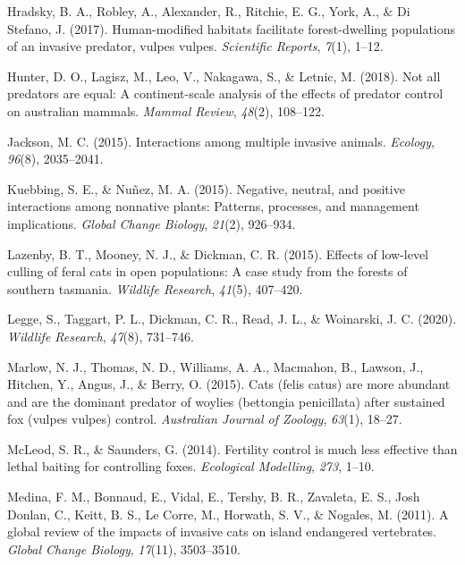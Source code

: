 \documentclass[]{elsarticle} %
\begin{document}
\leavevmode\hypertarget{ref-hradsky2017human}{}%
Hradsky, B. A., Robley, A., Alexander, R., Ritchie, E. G., York, A., \& Di Stefano, J. (2017). Human-modified habitats facilitate forest-dwelling populations of an invasive predator, vulpes vulpes. \emph{Scientific Reports}, \emph{7}(1), 1--12.

\leavevmode\hypertarget{ref-hunter2018}{}%
Hunter, D. O., Lagisz, M., Leo, V., Nakagawa, S., \& Letnic, M. (2018). Not all predators are equal: A continent-scale analysis of the effects of predator control on australian mammals. \emph{Mammal Review}, \emph{48}(2), 108--122.

\leavevmode\hypertarget{ref-jackson2015}{}%
Jackson, M. C. (2015). Interactions among multiple invasive animals. \emph{Ecology}, \emph{96}(8), 2035--2041.

\leavevmode\hypertarget{ref-kuebbing2015}{}%
Kuebbing, S. E., \& Nuñez, M. A. (2015). Negative, neutral, and positive interactions among nonnative plants: Patterns, processes, and management implications. \emph{Global Change Biology}, \emph{21}(2), 926--934.

\leavevmode\hypertarget{ref-lazenby2015}{}%
Lazenby, B. T., Mooney, N. J., \& Dickman, C. R. (2015). Effects of low-level culling of feral cats in open populations: A case study from the forests of southern tasmania. \emph{Wildlife Research}, \emph{41}(5), 407--420.

\leavevmode\hypertarget{ref-legge2020}{}%
Legge, S., Taggart, P. L., Dickman, C. R., Read, J. L., \& Woinarski, J. C. (2020). \emph{Wildlife Research}, \emph{47}(8), 731--746.

\leavevmode\hypertarget{ref-marlow2015}{}%
Marlow, N. J., Thomas, N. D., Williams, A. A., Macmahon, B., Lawson, J., Hitchen, Y., Angus, J., \& Berry, O. (2015). Cats (felis catus) are more abundant and are the dominant predator of woylies (bettongia penicillata) after sustained fox (vulpes vulpes) control. \emph{Australian Journal of Zoology}, \emph{63}(1), 18--27.

\leavevmode\hypertarget{ref-mcleod2014}{}%
McLeod, S. R., \& Saunders, G. (2014). Fertility control is much less effective than lethal baiting for controlling foxes. \emph{Ecological Modelling}, \emph{273}, 1--10.

\leavevmode\hypertarget{ref-medina2011}{}%
Medina, F. M., Bonnaud, E., Vidal, E., Tershy, B. R., Zavaleta, E. S., Josh Donlan, C., Keitt, B. S., Le Corre, M., Horwath, S. V., \& Nogales, M. (2011). A global review of the impacts of invasive cats on island endangered vertebrates. \emph{Global Change Biology}, \emph{17}(11), 3503--3510.
\end{document}
